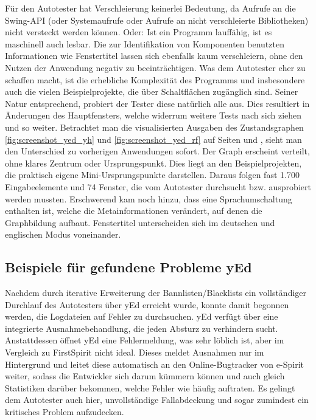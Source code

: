 Für den Autotester hat Verschleierung keinerlei Bedeutung, da Aufrufe
an die Swing-API (oder Systemaufrufe oder Aufrufe an nicht verschleierte 
Bibliotheken) nicht versteckt werden können. Oder: Ist ein Programm
lauffähig, ist es maschinell auch lesbar. Die zur Identifikation von Komponenten
benutzten Informationen wie Fenstertitel lassen sich ebenfalls kaum verschleiern,
ohne den Nutzen der Anwendung negativ zu beeinträchtigen. Was dem Autotester eher
zu schaffen macht, ist die erhebliche Komplexität des Programms und
insbesondere auch die vielen Beispielprojekte, die über Schaltflächen
zugänglich sind. Seiner Natur entsprechend, probiert der Tester diese
natürlich alle aus. Dies resultiert in Änderungen des Hauptfensters,
welche widerrum weitere Tests nach sich ziehen und so weiter. 
Betrachtet man die visualisierten
Ausgaben des Zustandsgraphen \ref{fig:screenshot_yed_yh} und 
\ref{fig:screenshot_yed_rf}  auf Seiten \pageref{fig:screenshot_yed_yh} 
und \pageref{fig:screenshot_yed_rf}, sieht man den Unterschied zu vorherigen
Anwendungen sofort. Der Graph erscheint verteilt, ohne klares Zentrum
oder Ursprungspunkt. Dies liegt an den Beispielprojekten, die praktisch
eigene Mini-Ursprungspunkte darstellen. Daraus folgen fast 1.700
Eingabeelemente und 74 Fenster, die vom Autotester durchsucht
bzw. ausprobiert werden mussten. Erschwerend kam noch hinzu,
dass eine Sprachumschaltung enthalten ist, welche die Metainformationen
verändert, auf denen die Graphbildung aufbaut. Fenstertitel
unterscheiden sich im deutschen und englischen Modus voneinander.


\subsection{Beispiele für gefundene Probleme yEd}

Nachdem durch iterative Erweiterung der Bannlisten/Blacklists
ein vollständiger Durchlauf des Autotesters über yEd erreicht wurde,
konnte damit begonnen werden, die Logdateien auf Fehler zu
durchsuchen. yEd verfügt über eine integrierte Ausnahmebehandlung,
die jeden Absturz zu verhindern sucht. Anstattdessen öffnet yEd eine
Fehlermeldung, was sehr löblich ist, aber im Vergleich zu FirstSpirit
nicht ideal. Dieses meldet Ausnahmen nur im Hintergrund und leitet
diese automatisch an den Online-Bugtracker von e-Spirit weiter,
sodass die Entwickler sich darum kümmern können und auch gleich
Statistiken darüber bekommen, welche Fehler wie häufig auftraten.
Es gelingt dem Autotester auch hier, unvollständige Fallabdeckung
und sogar zumindest ein kritisches Problem aufzudecken.


